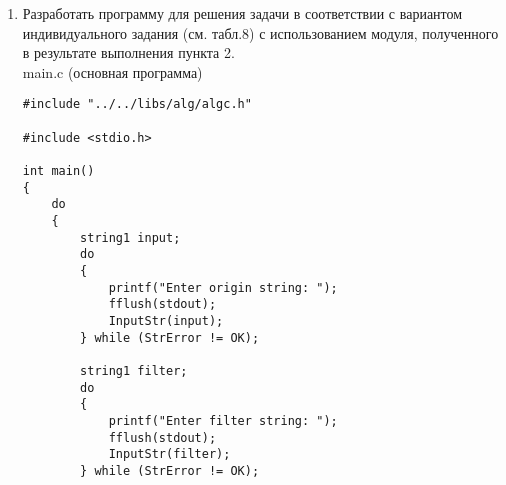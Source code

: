 \documentclass[a4paper,14pt]{extarticle}
\begin{document}
\begin{enumerate}
\begin{verbatim}
void Copy(string1 s, unsigned Index, unsigned Count, string1 Subs)
{
    if (Count >= sizeof(string1))
    {
        StrError = BUFFER_OVERFLOW;
        return;
    }

    int strlen = Length(s);
    if (StrError != OK)
        return;

    if (Index + Count > strlen && Count != 0)
    {
        StrError = OUT_OF_BOUNDS;
        return;
    }

    for (int i = 0; i < Count; i++)
    {
        Subs[i] = s[i + Index];
    }

    Subs[Count] = '\0';
}

unsigned Pos(string1 SubS, string1 s)
{
    int strlen = Length(s);
    if (StrError != OK)
        return -1;

    if (SubS[0] == '\0')
    {
        StrError = OK;
        return 0;
    }

    for (int i = 0; i < strlen; i++)
    {
        for (int j = 0; j < sizeof(string1); j++)
        {
            if (SubS[j] == '\0')
            {
                StrError = OK;
                return i;
            }
            else if (s[j + i] == '\0')
            {
                // Дальнейший поиск не имеет смысла, рассматриваемая подстрока больше
                // строки, в которой выполняется поиск.

                StrError = OK;
            }
            else if (s[j + i] != SubS[j])
            {
                break;
            }
        }
    }

    StrError = OK;
    return -1;
}
\end{verbatim}
\item Разработать программу для решения задачи в соответствии с 
вариантом индивидуального задания (см. табл.8) с использованием модуля, 
полученного в результате выполнения пункта 2.\\
main.c (основная программа)
\begin{verbatim}
#include "../../libs/alg/algc.h"

#include <stdio.h>

int main()
{
    do
    {
        string1 input;
        do
        {
            printf("Enter origin string: ");
            fflush(stdout);
            InputStr(input);
        } while (StrError != OK);

        string1 filter;
        do
        {
            printf("Enter filter string: ");
            fflush(stdout);
            InputStr(filter);
        } while (StrError != OK);


\end{verbatim}
\end{enumerate}
\end{document}
